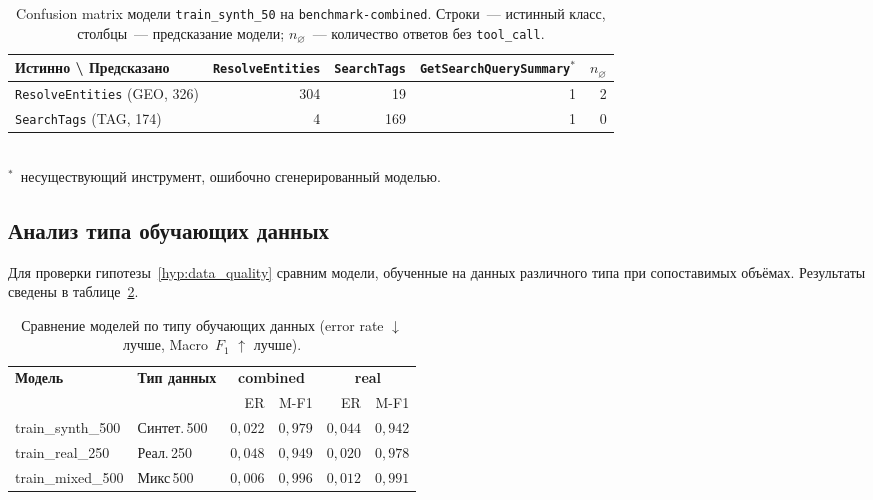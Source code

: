 \begin{table}[H]
\centering
\caption{Confusion matrix модели \texttt{train\_synth\_50} на \texttt{benchmark-combined}. Строки~--- истинный класс, столбцы~--- предсказание модели; $n_{\varnothing}$~--- количество ответов без \texttt{tool\_call}.}
\label{tab:confusion_synth50}
\def\arraystretch{1.15}
\setlength\tabcolsep{0.5em}
\begin{tabular}{l r r r r}
    \toprule
    \textbf{Истинно \textbackslash{} Предсказано} & \texttt{ResolveEntities} & \texttt{SearchTags} & \texttt{GetSearchQuerySummary}$^{*}$ & $n_\varnothing$ \\
    \midrule
    \texttt{ResolveEntities} (GEO, 326) & 304 & 19 & 1 & 2 \\
    \texttt{SearchTags}\phantom{Resolve} (TAG, 174) & 4 & 169 & 1 & 0 \\
    \bottomrule
\end{tabular}\\[0.4em]
{\footnotesize $^{*}$~несуществующий инструмент, ошибочно сгенерированный моделью.}
\end{table}

\subsection{Анализ типа обучающих данных} \label{subsec:data_type}

Для проверки гипотезы~\ref{hyp:data_quality} сравним модели, обученные на данных различного типа при сопоставимых объёмах. Результаты сведены в таблице~\ref{tab:data_type_comparison}.

\begin{table}[H]
\centering
\caption{Сравнение моделей по типу обучающих данных (error rate $\downarrow$ лучше, Macro~$F_1$ $\uparrow$ лучше).}
\label{tab:data_type_comparison}
\def\arraystretch{1.15}
\setlength\tabcolsep{0.35em}
\begin{tabular}{l l r r r r}
    \toprule
    \textbf{Модель} & \textbf{Тип данных} & \multicolumn{2}{c}{\textbf{combined}} & \multicolumn{2}{c}{\textbf{real}} \\
    \cmidrule(lr){3-4} \cmidrule(lr){5-6}
     & & ER & M-F1 & ER & M-F1 \\
    \midrule
    train\_synth\_500  & Синтет.\,500  & $0{,}022$ & $0{,}979$ & $0{,}044$ & $0{,}942$ \\
    train\_real\_250   & Реал.\,250    & $0{,}048$ & $0{,}949$ & $0{,}020$ & $0{,}978$ \\
    train\_mixed\_500  & Микс\,500     & $0{,}006$ & $0{,}996$ & $0{,}012$ & $0{,}991$ \\
    \bottomrule
\end{tabular}
\end{table}

